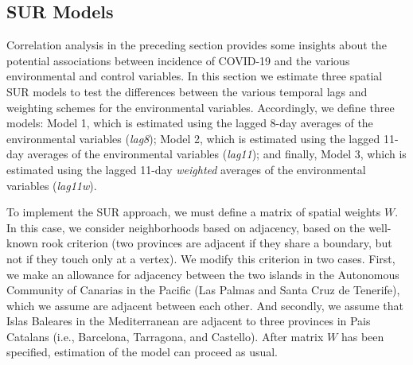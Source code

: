 \documentclass[]{elsarticle} %
\begin{document}
\hypertarget{sur-models}{%
\subsection{SUR Models}\label{sur-models}}

Correlation analysis in the preceding section provides some insights
about the potential associations between incidence of COVID-19 and the
various environmental and control variables. In this section we estimate
three spatial SUR models to test the differences between the various
temporal lags and weighting schemes for the environmental variables.
Accordingly, we define three models: Model 1, which is estimated using
the lagged 8-day averages of the environmental variables (\emph{lag8});
Model 2, which is estimated using the lagged 11-day averages of the
environmental variables (\emph{lag11}); and finally, Model 3, which is
estimated using the lagged 11-day \emph{weighted} averages of the
environmental variables (\emph{lag11w}).

To implement the SUR approach, we must define a matrix of spatial
weights \(W\). In this case, we consider neighborhoods based on
adjacency, based on the well-known rook criterion (two provinces are
adjacent if they share a boundary, but not if they touch only at a
vertex). We modify this criterion in two cases. First, we make an
allowance for adjacency between the two islands in the Autonomous
Community of Canarias in the Pacific (Las Palmas and Santa Cruz de
Tenerife), which we assume are adjacent between each other. And
secondly, we assume that Islas Baleares in the Mediterranean are
adjacent to three provinces in Pais Catalans (i.e., Barcelona,
Tarragona, and Castello). After matrix \(W\) has been specified,
estimation of the model can proceed as usual.
\end{document}

